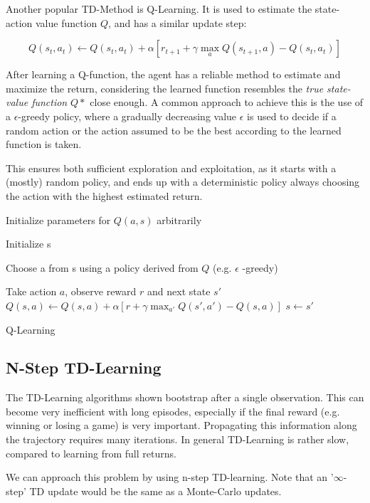Another popular TD-Method is Q-Learning.
It is used to estimate the state-action value function $Q$, and has a similar update step:

\begin{equation}
Q(s_t,a_t)\gets Q(s_t,a_t)+ \alpha [r_{t+1} + \gamma \max_a Q(s_{t+1},a)-Q(s_t,a_t)]
\end{equation}

After learning a Q-function, the agent has a reliable method to estimate and maximize the return, considering the learned function resembles the \textit{true state-value function} $Q*$ close enough. 
A common approach to achieve this is the use of a $\epsilon$-greedy policy, where a gradually decreasing value $\epsilon$ is used to decide if a random action or the action assumed to be the best according to the learned function is taken. 

This ensures both sufficient exploration and  exploitation, as it starts with a (mostly) random policy, and ends up with a deterministic policy always choosing the action with the highest estimated return.\citet{Sut98}

\begin{algorithm}[h]

 Initialize parameters for $Q(a,s)$ arbitrarily
 
 { 
 Initialize s
 
 {
 
 Choose a from s using a policy derived from $Q$ (e.g. $\epsilon$ -greedy)
  
 Take action $a$, observe reward $r$ and next state $s'$
 $Q(s,a) \gets Q(s,a) + \alpha[r+ \gamma \max_{a'}Q(s',a')-Q(s,a)]$
 $s \gets s'$
 }
 }

 \caption{Q-Learning \citep{Sut98}}
\end{algorithm}


\subsection{N-Step TD-Learning}

The TD-Learning algorithms shown bootstrap after a single observation. This can become very inefficient with long episodes, especially if the final reward (e.g. winning or losing a game) is very important. Propagating this information along the trajectory requires many iterations.
In general TD-Learning is rather slow, compared to learning from full returns.

We can approach this problem by using n-step TD-learning.
Note that an '$ \infty $-step' TD update would be the same as a Monte-Carlo updates.

